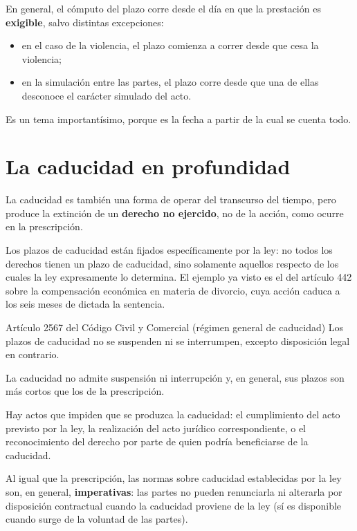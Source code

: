 \documentclass[12pt,oneside]{book}
\begin{document}
En general, el cómputo del plazo corre desde el día en que la prestación es \textbf{exigible}, salvo distintas excepciones:
\begin{itemize}
    \item en el caso de la violencia, el plazo comienza a correr desde que cesa la violencia;
    \item en la simulación entre las partes, el plazo corre desde que una de ellas desconoce el carácter simulado del acto.
\end{itemize}

\begin{important}
Es un tema importantísimo, porque es la fecha a partir de la cual se cuenta todo.
\end{important}

\section{La caducidad en profundidad}

La caducidad es también una forma de operar del transcurso del tiempo, pero produce la extinción de un \textbf{derecho no ejercido}, no de la acción, como ocurre en la prescripción.

Los plazos de caducidad están fijados específicamente por la ley: no todos los derechos tienen un plazo de caducidad, sino solamente aquellos respecto de los cuales la ley expresamente lo determina. El ejemplo ya visto es el del artículo 442 sobre la compensación económica en materia de divorcio, cuya acción caduca a los seis meses de dictada la sentencia.

\begin{articulo}{Artículo 2567 del Código Civil y Comercial (régimen general de caducidad)}
Los plazos de caducidad no se suspenden ni se interrumpen, excepto disposición legal en contrario.
\end{articulo}

La caducidad no admite suspensión ni interrupción y, en general, sus plazos son más cortos que los de la prescripción.

Hay actos que impiden que se produzca la caducidad: el cumplimiento del acto previsto por la ley, la realización del acto jurídico correspondiente, o el reconocimiento del derecho por parte de quien podría beneficiarse de la caducidad.

Al igual que la prescripción, las normas sobre caducidad establecidas por la ley son, en general, \textbf{imperativas}: las partes no pueden renunciarla ni alterarla por disposición contractual cuando la caducidad proviene de la ley (sí es disponible cuando surge de la voluntad de las partes). %
\end{document}
